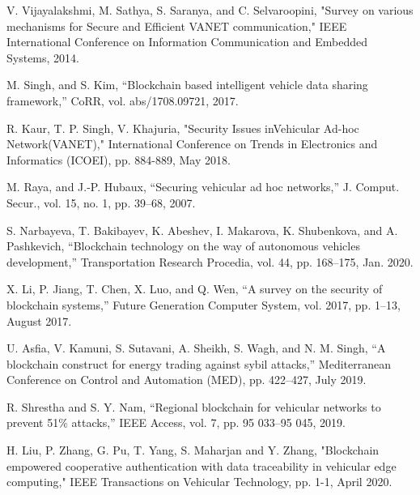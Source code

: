 \documentclass[journal,10pt]{IEEEtran}
\begin{document}
\ifCLASSOPTIONcaptionsoff
  \newpage
\fi


\begin{thebibliography}{1}

V. Vijayalakshmi, M. Sathya, S. Saranya, and C. Selvaroopini, "Survey on various mechanisms for Secure and Efficient VANET communication," IEEE International Conference on Information Communication and Embedded Systems, 2014.

M. Singh, and S. Kim, “Blockchain based intelligent vehicle data sharing framework,” CoRR, vol. abs/1708.09721, 2017.

R. Kaur, T. P. Singh, V. Khajuria, "Security Issues inVehicular Ad-hoc Network(VANET)," International Conference on Trends in Electronics and Informatics (ICOEI), pp. 884-889, May 2018.

M. Raya, and J.-P. Hubaux, “Securing vehicular ad hoc networks,” J. Comput. Secur., vol. 15, no. 1, pp. 39–68, 2007.

S. Narbayeva, T. Bakibayev, K. Abeshev, I. Makarova, K. Shubenkova, and A. Pashkevich, “Blockchain technology on the way of autonomous vehicles development,” Transportation Research Procedia, vol. 44, pp. 168–175, Jan. 2020.

 X. Li, P. Jiang, T. Chen, X. Luo, and Q. Wen, “A survey on the security of blockchain systems,” Future Generation Computer System, vol. 2017, pp. 1–13, August 2017.

U. Asfia, V. Kamuni, S. Sutavani, A. Sheikh, S. Wagh, and N. M. Singh, “A blockchain construct for energy trading against sybil attacks,” Mediterranean Conference on Control and Automation (MED), pp. 422–427, July 2019.

R. Shrestha and S. Y. Nam, “Regional blockchain for vehicular networks to prevent 51\% attacks,” IEEE Access, vol. 7, pp. 95 033–95 045, 2019.

H. Liu, P. Zhang, G. Pu, T. Yang, S. Maharjan and Y. Zhang, "Blockchain empowered cooperative authentication with data traceability in vehicular edge computing," IEEE Transactions on Vehicular Technology, pp. 1-1, April 2020.


\end{thebibliography}
\end{document}
